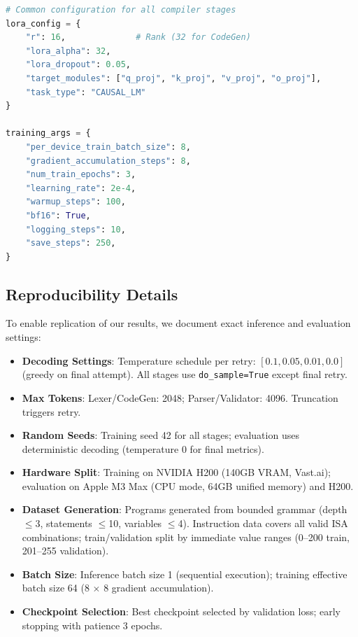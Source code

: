 \documentclass[11pt,a4paper]{article}
\begin{document}
\begin{lstlisting}[language=Python, caption=LoRA Training Configuration]
# Common configuration for all compiler stages
lora_config = {
    "r": 16,              # Rank (32 for CodeGen)
    "lora_alpha": 32,
    "lora_dropout": 0.05,
    "target_modules": ["q_proj", "k_proj", "v_proj", "o_proj"],
    "task_type": "CAUSAL_LM"
}

training_args = {
    "per_device_train_batch_size": 8,
    "gradient_accumulation_steps": 8,
    "num_train_epochs": 3,
    "learning_rate": 2e-4,
    "warmup_steps": 100,
    "bf16": True,
    "logging_steps": 10,
    "save_steps": 250,
}
\end{lstlisting}

\subsection{Reproducibility Details}

To enable replication of our results, we document exact inference and evaluation settings:

\begin{itemize}
    \item \textbf{Decoding Settings}: Temperature schedule per retry: $[0.1, 0.05, 0.01, 0.0]$ (greedy on final attempt). All stages use \texttt{do\_sample=True} except final retry.
    \item \textbf{Max Tokens}: Lexer/CodeGen: 2048; Parser/Validator: 4096. Truncation triggers retry.
    \item \textbf{Random Seeds}: Training seed 42 for all stages; evaluation uses deterministic decoding (temperature 0 for final metrics).
    \item \textbf{Hardware Split}: Training on NVIDIA H200 (140GB VRAM, Vast.ai); evaluation on Apple M3 Max (CPU mode, 64GB unified memory) and H200.
    \item \textbf{Dataset Generation}: Programs generated from bounded grammar (depth $\leq$3, statements $\leq$10, variables $\leq$4). Instruction data covers all valid ISA combinations; train/validation split by immediate value ranges (0--200 train, 201--255 validation).
    \item \textbf{Batch Size}: Inference batch size 1 (sequential execution); training effective batch size 64 (8 $\times$ 8 gradient accumulation).
    \item \textbf{Checkpoint Selection}: Best checkpoint selected by validation loss; early stopping with patience 3 epochs.
\end{itemize}
\end{document}
